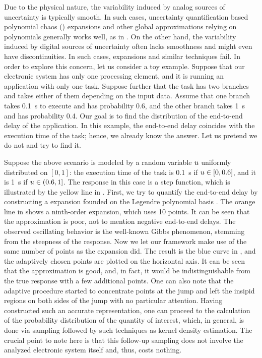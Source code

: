
Due to the physical nature, the variability induced by analog sources of
uncertainty is typically smooth. In such cases, uncertainty quantification based
polynomial chaos () expansions \cite{xiu2010} and other global
approximations relying on polynomials generally works well, as in
\cite{bhardwaj2008, lee2013, ukhov2014, ukhov2015}. On the other hand, the
variability induced by digital sources of uncertainty often lacks smoothness and
might even have discontinuities. In such cases,  expansions and similar
techniques fail. In order to explore this concern, let us consider a toy
example. Suppose that our electronic system has only one processing element, and
it is running an application with only one task. Suppose further that the task
has two branches and takes either of them depending on the input data. Assume
that one branch takes 0.1~s to execute and has probability 0.6, and the other
branch takes 1~s and has probability 0.4. Our goal is to find the distribution
of the end-to-end delay of the application. In this example, the end-to-end
delay coincides with the execution time of the task; hence, we already know the
answer. Let us pretend we do not and try to find it.

Suppose the above scenario is modeled by a random variable $u$ uniformly
distributed on $[0, 1]$: the execution time of the task is 0.1~s if $u \in [0,
0.6]$, and it is 1~s if $u \in (0.6, 1]$. The response in this case is a step
function, which is illustrated by the yellow line in . First,
we try to quantify the end-to-end delay by constructing a  expansion
founded on the Legendre polynomial basis \cite{xiu2010}. The orange line in
 shows a ninth-order  expansion, which uses 10 points.
It can be seen that the approximation is poor, not to mention negative
end-to-end delays. The observed oscillating behavior is the well-known Gibbs
phenomenon, stemming from the steepness of the response. Now we let our
framework make use of the same number of points as the  expansion did.
The result is the blue curve in , and the adaptively chosen
points are plotted on the horizontal axis. It can be seen that the approximation
is good, and, in fact, it would be indistinguishable from the true response with
a few additional points. One can also note that the adaptive procedure started
to concentrate points at the jump and left the insipid regions on both sides of
the jump with no particular attention. Having constructed such an accurate
representation, one can proceed to the calculation of the probability
distribution of the quantity of interest, which, in general, is done via
sampling followed by such techniques as kernel density estimation. The crucial
point to note here is that this follow-up sampling does not involve the analyzed
electronic system itself and, thus, costs nothing.

